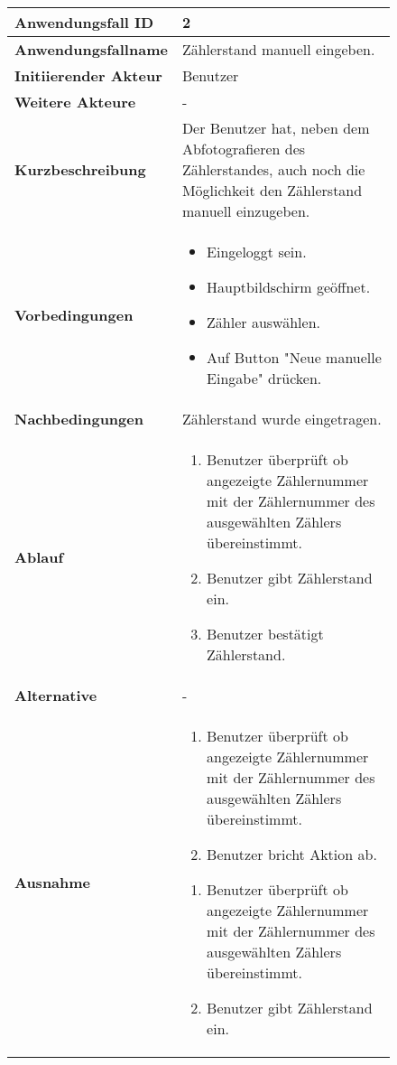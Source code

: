 \newpage

\begin{figure}[h]
	\centering
	\begin{tabularx}{\textwidth}{ X | X }
		\textbf{Anwendungsfall ID} & 2 \\ \hline
		\textbf{Anwendungsfallname} & Zählerstand manuell eingeben. \\ \hline
		\textbf{Initiierender Akteur} & Benutzer \\ \hline
		\textbf{Weitere Akteure} & - \\ \hline
		\textbf{Kurzbeschreibung} & Der Benutzer hat, neben dem Abfotografieren des Zählerstandes, auch noch die Möglichkeit den Zählerstand manuell 									einzugeben.  \\ \hline
		\textbf{Vorbedingungen} &
		\begin {itemize}
			\item Eingeloggt sein. 
			\item Hauptbildschirm geöffnet.
			\item Zähler auswählen.
			\item Auf Button "Neue manuelle Eingabe" drücken.
		\end{itemize}\\ \hline
		\textbf{Nachbedingungen} & Zählerstand wurde eingetragen.  \\ \hline
		\textbf{Ablauf} &
		\begin{enumerate}
			\item Benutzer überprüft ob angezeigte Zählernummer mit der Zählernummer des ausgewählten Zählers übereinstimmt.
			\item Benutzer gibt Zählerstand ein.
			\item Benutzer bestätigt Zählerstand.
		\end{enumerate} \\ \hline
		\textbf{Alternative} & - \\ \hline
		\textbf{Ausnahme} &
		\begin{enumerate}
			\item Benutzer überprüft ob angezeigte Zählernummer mit der Zählernummer des ausgewählten Zählers übereinstimmt.
			\item Benutzer bricht Aktion ab.
		\end{enumerate}
		\begin{enumerate}
			\item Benutzer überprüft ob angezeigte Zählernummer mit der Zählernummer des ausgewählten Zählers übereinstimmt.
			\item Benutzer gibt Zählerstand ein.

\end{enumerate}
\end{tabularx}
\end{figure}
